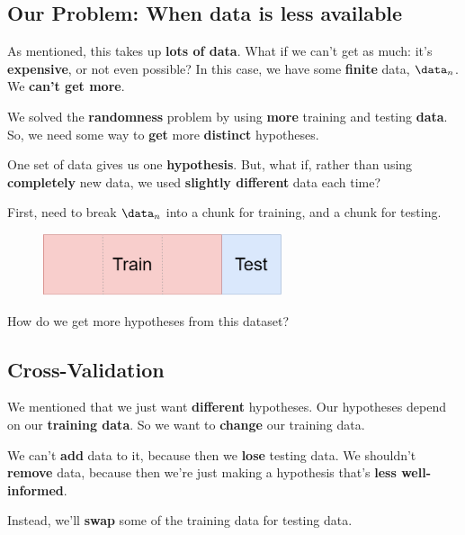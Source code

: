     \subsection*{Our Problem: When data is less available}
        
        As mentioned, this takes up \textbf{lots of data}. What if we can't get as much: it's \textbf{expensive}, or not even possible? In this case, we have some \textbf{finite} data, $\data_n$. We \textbf{can't get more}.
        
        We solved the \textbf{randomness} problem by using \textbf{more} training and testing \textbf{data}. So, we need some way to \textbf{get} more \textbf{distinct} hypotheses.
        
        One set of data gives us one \textbf{hypothesis}. But, what if, rather than using \textbf{completely} new data, we used \textbf{slightly different} data each time?
        
        First, need to break $\data_n$ into a chunk for training, and a chunk for testing.
        
        \begin{figure}[H]
        \centering
            \includegraphics[width=70mm,scale=0.5]{images/regression_images/training_and_test_data.png}
        \end{figure}
        
        How do we get more hypotheses from this dataset?
        
    \subsection*{Cross-Validation}
    
        We mentioned that we just want \textbf{different} hypotheses. Our hypotheses depend on our \textbf{training data}. So we want to \textbf{change} our training data.
        
        We can't \textbf{add} data to it, because then we \textbf{lose} testing data. We shouldn't \textbf{remove} data, because then we're just making a hypothesis that's \textbf{less well-informed}.
        
        Instead, we'll \textbf{swap} some of the training data for testing data.
        
